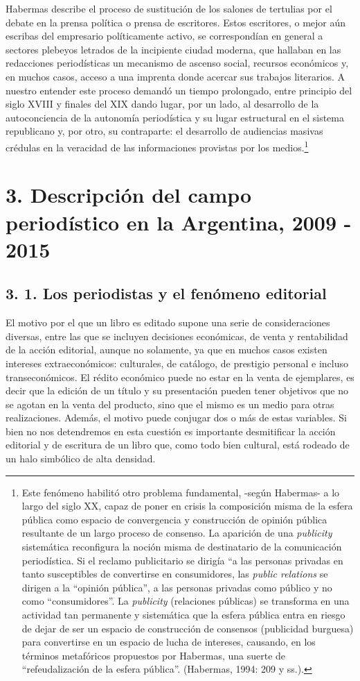 Habermas describe el proceso de sustitución de los salones de tertulias por el debate en la prensa política o prensa de escritores. Estos escritores, o mejor aún escribas del empresario políticamente activo, se correspondían en general a sectores plebeyos letrados de la incipiente ciudad moderna, que hallaban en las redacciones periodísticas un mecanismo de ascenso social, recursos económicos y, en muchos casos, acceso a una imprenta donde acercar sus trabajos literarios. A nuestro entender este proceso demandó un tiempo prolongado, entre principio del siglo XVIII y finales del XIX dando lugar, por un lado, al desarrollo de la autoconciencia de la autonomía periodística y su lugar estructural en el sistema republicano y, por otro, su contraparte: el desarrollo de audiencias masivas crédulas en la veracidad de las informaciones provistas por los medios.\footnote{Este fenómeno habilitó otro problema fundamental, -según Habermas- a lo largo del siglo XX, capaz de poner en crisis la composición misma de la esfera pública como espacio de convergencia y construcción de opinión pública resultante de un largo proceso de consenso. La aparición de una \emph{publicity} sistemática reconfigura la noción misma de destinatario de la comunicación periodística. Si el reclamo publicitario se dirigía ``a las personas privadas en tanto susceptibles de convertirse en consumidores, las \emph{public relations} se dirigen a la ``opinión pública'', a las personas privadas como público y no como ``consumidores''. La \emph{publicity} (relaciones públicas) se transforma en una actividad tan permanente y sistemática que la esfera pública entra en riesgo de dejar de ser un espacio de construcción de consensos (publicidad burguesa) para convertirse en un espacio de lucha de intereses, causando, en los términos metafóricos propuestos por Habermas, una suerte de ``refeudalización de la esfera pública''. (Habermas, 1994: 209 y ss.).}

\chapter{3. Descripción del campo periodístico en la Argentina, 2009 - 2015}


\section{3. 1. Los periodistas y el fenómeno editorial}

El motivo por el que un libro es editado supone una serie de consideraciones diversas, entre las que se incluyen decisiones económicas, de venta y rentabilidad de la acción editorial, aunque no solamente, ya que en muchos casos existen intereses extraeconómicos: culturales, de catálogo, de prestigio personal e incluso transeconómicos. El rédito económico puede no estar en la venta de ejemplares, es decir que la edición de un título y su presentación pueden tener objetivos que no se agotan en la venta del producto, sino que el mismo es un medio para otras realizaciones. Además, el motivo puede conjugar dos o más de estas variables. Si bien no nos detendremos en esta cuestión es importante desmitificar la acción editorial y de escritura de un libro que, como todo bien cultural, está rodeado de un halo simbólico de alta densidad.

